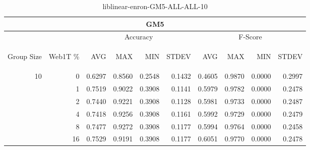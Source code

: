 \begin{center}
\begin{table}[htbp]
\begin{tabular}{ | r | r | r | r | r | r | r | r | r | r |}
\hline
\multicolumn{10}{|c|}{GM5}\\
\hline
 & & \multicolumn{4}{|c|}{Accuracy} & \multicolumn{4}{|c|}{F-Score}\\ \cline{3-10}
\begin{sideways}Group Size\end{sideways} & \begin{sideways}Web1T \%\end{sideways} & \begin{sideways}AVG\end{sideways} & \begin{sideways}MAX\end{sideways} & \begin{sideways}MIN\end{sideways} & \begin{sideways}STDEV\end{sideways} & \begin{sideways}AVG\end{sideways} & \begin{sideways}MAX\end{sideways} & \begin{sideways}MIN\end{sideways} & \begin{sideways}STDEV\end{sideways}\\
\hline
\multirow{6}{*}{10}
 & 0 & 0.6297 & 0.8560 & 0.2548 & 0.1432 & 0.4605 & 0.9870 & 0.0000 & 0.2997\\ \cline{2-10}
 & 1 & 0.7519 & 0.9022 & 0.3908 & 0.1141 & 0.5979 & 0.9782 & 0.0000 & 0.2478\\ \cline{2-10}
 & 2 & 0.7440 & 0.9221 & 0.3908 & 0.1128 & 0.5981 & 0.9733 & 0.0000 & 0.2487\\ \cline{2-10}
 & 4 & 0.7418 & 0.9256 & 0.3908 & 0.1161 & 0.5992 & 0.9729 & 0.0000 & 0.2479\\ \cline{2-10}
 & 8 & 0.7477 & 0.9272 & 0.3908 & 0.1177 & 0.5994 & 0.9764 & 0.0000 & 0.2458\\ \cline{2-10}
 & 16 & 0.7529 & 0.9191 & 0.3908 & 0.1177 & 0.6051 & 0.9770 & 0.0000 & 0.2478\\ \cline{2-10}
\hline
\end{tabular}
\caption{liblinear-enron-GM5-ALL-ALL-10}
\end{table}
\end{center}

